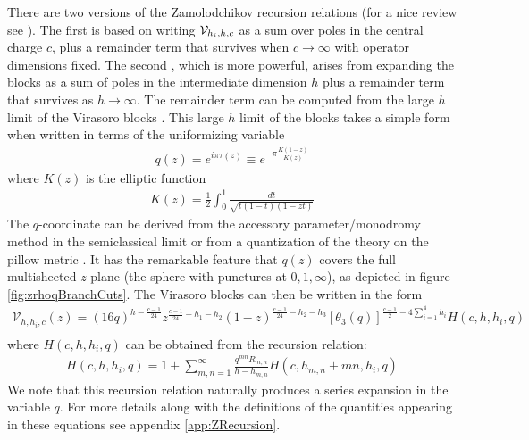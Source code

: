 \documentclass[12pt]{article}
\numberwithin{equation}{section}
\newcommand{\be}{\begin{eqnarray}}
\newcommand{\ee}{\end{eqnarray}}
\newcommand{\CV}{{\cal V}}
\newcommand{\nn}{\nonumber}
\begin{document}
There are two versions of the Zamolodchikov recursion relations (for a nice review see \cite{Perlmutter:2015iya}).  The first \cite{ZamolodchikovRecursion} is based on writing $\CV_{h_i, h,c}$ as a sum over poles in the central charge $c$, plus a remainder term that survives when $c \to \infty$ with operator dimensions fixed.  The second \cite{Zamolodchikovq}, which is more powerful, arises from expanding the blocks as a sum of poles in the intermediate dimension $h$ plus a remainder term that survives as $h \to \infty$.  The remainder term can be computed from the large $h$ limit of the Virasoro blocks \cite{Zamolodchikov:1986gh, Zamolodchikovq}.  This large $h$ limit of the blocks takes a simple form when written in terms of the uniformizing variable
\be\label{eq:qz}
q(z) = e^{i \pi \tau(z)} \equiv e^{- \pi \frac{K(1-z)}{K(z)} }
\ee
where $K(z)$ is the elliptic function
\be
K(z) = \frac{1}{2} \int_0^1 \frac{dt}{\sqrt{ t(1-t)(1-zt) } }
\ee
The $q$-coordinate can be derived from the accessory parameter/monodromy method in the semiclassical limit \cite{HarlowLiouville} or from a quantization of the theory on the pillow metric \cite{Maldacena:2015iua}.  It has  the remarkable feature that $q(z)$ covers the full multisheeted $z$-plane (the sphere with punctures at $0,1,\infty$), as depicted in figure \ref{fig:zrhoqBranchCuts}. The Virasoro blocks can then be written in the form
\be\label{eq:FullVBlock}
\mathcal{V}_{h,h_{i},c}\left(z\right)=\left(16q\right)^{h-\frac{c-1}{24}}z^{\frac{c-1}{24}-h_{1}-h_{2}}\left(1-z\right)^{\frac{c-1}{24}-h_{2}-h_{3}}\left[\theta_{3}\left(q\right)\right]^{\frac{c-1}{2}-4\sum_{i=1}^{4}h_{i}}H\left(c,h,h_{i},q\right)
\nn \\
\ee
 where $H\left(c,h,h_{i},q\right)$ can be obtained from the recursion relation:
\be
H\left(c,h,h_{i},q\right)=1+\sum_{m,n=1}^\infty\frac{q^{mn}R_{m,n} }{h-h_{m,n}}H\left(c,h_{m,n}+mn,h_{i},q\right)
\ee
We note that this recursion relation naturally produces a series expansion in the variable $q$.  For more details along with the definitions of the quantities appearing in these equations see appendix  \ref{app:ZRecursion}.  
\end{document}
